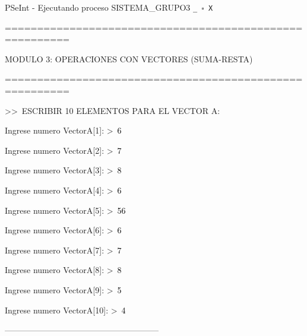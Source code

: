 \documentclass[12pt,a4paper]{article}
\newcommand{\consola}[1]{\noindent\textcolor{pseString}{#1}}
\newcommand{\entrada}[1]{\textcolor{black}{#1}}
\newenvironment{PSeIntWindow}{%
	\begin{tcolorbox}[
		breakable,
		enhanced,
		colback=white,
		colframe=black!60,
		boxrule=0.5pt,
		arc=1mm,
		left=0mm,
		right=0mm,
		top=0mm,
		bottom=2mm,
		width=\textwidth
		]
	}{%
	\end{tcolorbox}
}
\newcommand{\BarraPSeInt}{%
	\colorbox{gray!20}{%
		\parbox{\dimexpr\textwidth-2\fboxsep\relax}{%
			\small
			\textcolor{pseString}{\faPlayCircle}
			\hspace{0.3em}
			PSeInt - Ejecutando proceso SISTEMA\_GRUPO3
			\hfill
			\texttt{\_ \hspace{0.5em} \(\square\) \hspace{0.5em} X}
		}
	}
}
\begin{document}
	\begin{PSeIntWindow}
		
		\BarraPSeInt
		
		\vspace{0.2cm}
		
		\ttfamily
		\small
		
		\consola{========================================================}\par
		
		\begin{center}
			\textcolor{pseString}{MODULO 3: OPERACIONES CON VECTORES (SUMA-RESTA)}
		\end{center}
		
		\consola{========================================================}\par
		
		\vspace{0.2cm}
		
		\consola{\textgreater\textgreater\ ESCRIBIR 10 ELEMENTOS PARA EL VECTOR A:}\par
		
		\vspace{0.15cm}
		
		\consola{Ingrese numero VectorA[1]: \textgreater\ }\entrada{6}\par
		\consola{Ingrese numero VectorA[2]: \textgreater\ }\entrada{7}\par
		\consola{Ingrese numero VectorA[3]: \textgreater\ }\entrada{8}\par
		\consola{Ingrese numero VectorA[4]: \textgreater\ }\entrada{6}\par
		\consola{Ingrese numero VectorA[5]: \textgreater\ }\entrada{56}\par
		\consola{Ingrese numero VectorA[6]: \textgreater\ }\entrada{6}\par
		\consola{Ingrese numero VectorA[7]: \textgreater\ }\entrada{7}\par
		\consola{Ingrese numero VectorA[8]: \textgreater\ }\entrada{8}\par
		\consola{Ingrese numero VectorA[9]: \textgreater\ }\entrada{5}\par
		\consola{Ingrese numero VectorA[10]: \textgreater\ }\entrada{4}\par
		
		\vspace{0.2cm}
		
		\consola{--------------------------------------------------------}\par
		

\end{PSeIntWindow}
\end{document}
